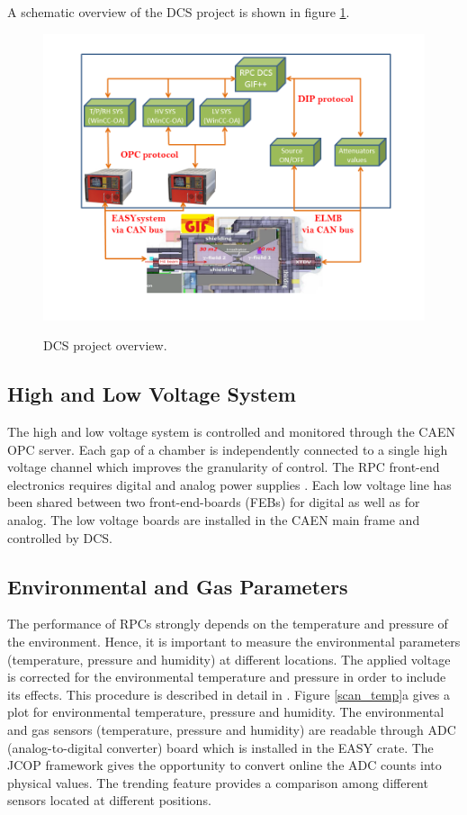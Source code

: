 A schematic overview of the DCS project is shown in figure \ref{fig:DCS_sys}.
\begin{figure}[H]
\centering
\hspace{-0.5cm}
\includegraphics[scale=0.4,trim=60 30 60 30,clip]{fig/wincc/DCS_sys.png}\\
 \caption{DCS project overview.}
\label{fig:DCS_sys}
\end{figure}

\subsection{High and Low Voltage System}
The high and low voltage system is controlled and monitored through the CAEN OPC server. Each gap of a chamber is independently connected to a single high voltage channel which improves the granularity of control. The RPC front-end electronics requires digital and analog power supplies \cite{feb}. Each low voltage line has been shared between two front-end-boards (FEBs) for digital as well as for analog. The low voltage boards are installed in the CAEN main frame and controlled by DCS.

\subsection{Environmental and Gas Parameters}
The performance of RPCs strongly depends on the temperature and pressure of the environment. Hence, it is important to measure the environmental parameters (temperature, pressure and humidity) at different locations. The applied voltage is corrected for the environmental temperature and pressure in order to include its effects. This procedure is described in detail in \cite{env-rpc}.  
Figure \ref{scan_temp}a gives a plot for environmental temperature, pressure and humidity. The environmental and gas sensors (temperature, pressure and humidity) are readable through ADC (analog-to-digital converter) board which is installed in the EASY crate. The JCOP framework gives the opportunity to convert online the ADC counts into physical values. The trending feature provides a comparison among different sensors located at different positions.

